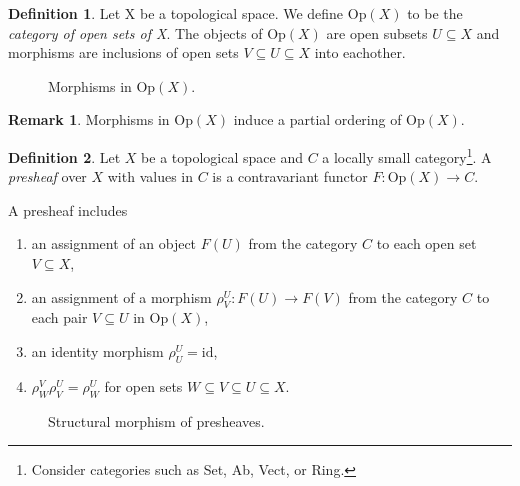 \documentclass{article}
\theoremstyle{definition}
\newtheorem{definition}{Definition}
\newtheorem*{remark}{Remark}
\begin{document}
\begin{definition}
    Let X be a topological space. We define Op$(X)$ to be the \emph{category of open sets of X}. The objects of Op$(X)$ are open subsets $U \subseteq X$ and morphisms are inclusions of open sets $V \subseteq U \subseteq X$ into eachother.

    \begin{figure}[ht]
        \centering
        \caption{Morphisms in Op$(X)$.}
    \end{figure}
\end{definition}

\begin{remark}
    Morphisms in Op$(X)$ induce a partial ordering of Op$(X)$.
\end{remark}

\begin{definition}
    Let $X$ be a topological space and $C$ a locally small category\footnote{Consider categories such as Set, Ab, Vect, or Ring.}. A \emph{presheaf} over $X$ with values in $C$ is a contravariant functor $F:\text{Op}(X) \rightarrow C$.

A presheaf includes
\begin{enumerate}
    \item an assignment of an object $F(U)$ from the category $C$ to each open set $V \subseteq X$,
    \item an assignment of a morphism $\rho_V^U: F(U) \rightarrow F(V)$ from the category $C$ to each pair $V \subseteq U$ in Op$(X)$,
    \item an identity morphism $\rho_U^U = \text{id}$,
    \item $\rho_W^V \rho_V^U= \rho_W^U$ for open sets $W \subseteq V \subseteq U \subseteq X$.
\end{enumerate}

\begin{figure}[h]
    \centering
    \caption{Structural morphism of presheaves.}
\end{figure}
\end{definition}
\end{document}
